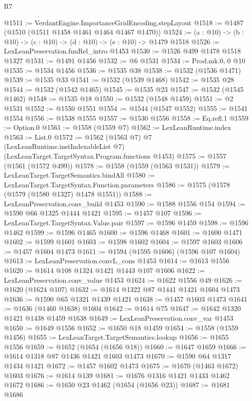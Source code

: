 \begin{lexlean}{R7}
\begin{coremodule}
@1511 := VerdantEngine.ImportanceGridEncoding.stepLayout
@1518 := @1487 (@1510 (@1511 @1458 @1461 @1464 @1467 @1470))
@1524 := (a : @10) -> (b : @10) -> (c : @10) -> (d : @10) -> (e : @10) -> @1479 @1518
@1526 := LexLeanPreservation.funRel_intro @1453
@1530 := @1526 @499 @1478 @1518 @1327
@1531 := @1491 @1456
@1532 := @6 @1531
@1534 := Prod.mk.{0, 0} @10
@1535 := @1534 @1456
@1536 := @1535 @38
@1538 := @1532 (@1536 @1471)
@1539 := @1535 @33
@1541 := @1532 (@1539 @1468)
@1542 := @1535 @28
@1544 := @1532 (@1542 @1465)
@1545 := @1535 @23
@1547 := @1532 (@1545 @1462)
@1548 := @1535 @18
@1550 := @1532 (@1548 @1459)
@1551 := @2 @1531
@1552 := @1550 @1551
@1554 := @1544 (@1547 @1552)
@1555 := @1541 @1554
@1556 := @1538 @1555
@1557 := @1530 @1556
@1558 := Eq.refl.{1}
@1559 := Option.{0}
@1561 := @1558 (@1559 @7)
@1562 := LexLeanRuntime.index
@1563 := List.{0}
@1572 := @1562
    (@1563 @7)
    @7
    (LexLeanRuntime.instIndexableList @7)
    (LexLeanTarget.TargetSyntax.Program.functions @1453)
@1575 := @1557 (@1561 (@1572 @499))
@1578 := @1558 (@1559 (@1563 @1531))
@1579 := LexLeanTarget.TargetSemantics.bindAll
@1580 := LexLeanTarget.TargetSyntax.Function.parameters
@1586 := @1575 (@1578 (@1579 (@1580 @1327) @1478 @1551))
@1588 := LexLeanPreservation.conv_build @1453
@1590 := @1588 @1556 @154
@1594 := @1590 @66 @1325 @1444 @1421
@1595 := @1457 @107
@1596 := LexLeanTarget.TargetSyntax.Value.pair
@1597 := @1596 @1459
@1598 := @1596 @1462
@1599 := @1596 @1465
@1600 := @1596 @1468
@1601 := @1600 @1471
@1602 := @1599 @1601
@1603 := @1598 @1602
@1604 := @1597 @1603
@1606 := @1457 @1604 @1473
@1611 := @1594 (@1595 @1606) (@1596 @107 @1604)
@1613 := LexLeanPreservation.convL_cons @1453
@1614 := @1613 @1556
@1620 := @1614 @108 @1324 @1421 @1443 @107 @1606
@1622 := LexLeanPreservation.conv_value @1453
@1624 := @1622 @1556 @49
@1626 := @1620 (@1624 @107)
@1632 := @1614 @1322 @87 @1441 @1421 @1604 @1473
@1636 := @1590 @65 @1321 @1439 @1421
@1638 := @1457 @1603 @1473
@1641 := @1636 (@1460 @1638) @1604
@1642 := @1614 @75
@1647 := @1642 @1320 @1421 @1438 @1459 @1638
@1649 := LexLeanPreservation.conv_var @1453
@1650 := @1649 @1556
@1652 := @1650 @18 @1459
@1654 := @1558 (@1559 @1456)
@1655 := LexLeanTarget.TargetSemantics.lookup
@1656 := @1655 @1556
@1659 := @1652 (@1654 (@1656 @18))
@1660 := @1647 @1659
@1666 := @1614 @1318 @87 @1436 @1421 @1603 @1473
@1670 := @1590 @64 @1317 @1434 @1421
@1672 := @1457 @1602 @1473
@1675 := @1670 (@1463 @1672) @1603
@1676 := @1614 @139
@1681 := @1676 @1316 @1421 @1433 @1462 @1672
@1686 := @1650 @23 @1462 (@1654 (@1656 @23))
@1687 := @1681 @1686

\end{coremodule}
\end{lexlean}
